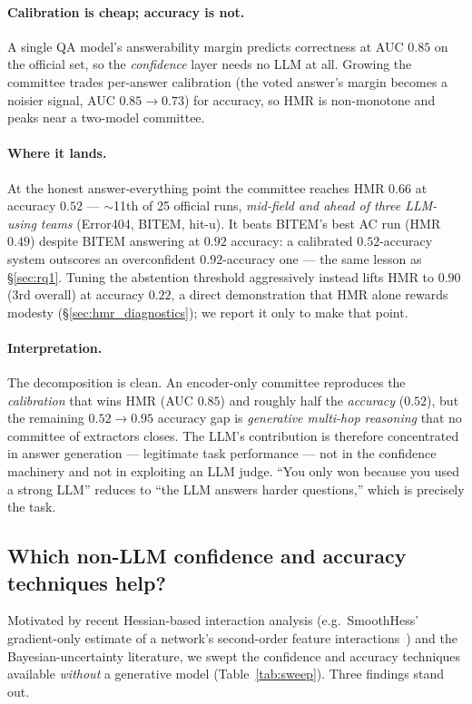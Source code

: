 \documentclass[11pt,a4paper]{article}
\begin{document}
\paragraph{Calibration is cheap; accuracy is not.} A single QA model's
answerability margin predicts correctness at AUC $0.85$ on the official set, so
the \emph{confidence} layer needs no LLM at all. Growing the committee trades
per-answer calibration (the voted answer's margin becomes a noisier signal, AUC
$0.85\!\to\!0.73$) for accuracy, so HMR is non-monotone and peaks near a two-model
committee.

\paragraph{Where it lands.} At the honest answer-everything point the committee
reaches HMR $0.66$ at accuracy $0.52$ --- $\sim$11th of 25 official runs,
\emph{mid-field and ahead of three LLM-using teams} (Error404, BITEM, hit-u). It
beats BITEM's best AC run (HMR $0.49$) despite BITEM answering at $0.92$
accuracy: a calibrated $0.52$-accuracy system outscores an overconfident
$0.92$-accuracy one --- the same lesson as \S\ref{sec:rq1}. Tuning the abstention
threshold aggressively instead lifts HMR to $0.90$ (3rd overall) at accuracy
$0.22$, a direct demonstration that HMR alone rewards modesty
(\S\ref{sec:hmr_diagnostics}); we report it only to make that point.

\paragraph{Interpretation.} The decomposition is clean. An encoder-only committee
reproduces the \emph{calibration} that wins HMR (AUC $0.85$) and roughly half the
\emph{accuracy} ($0.52$), but the remaining $0.52\!\to\!0.95$ accuracy gap is
\emph{generative multi-hop reasoning} that no committee of extractors closes. The
LLM's contribution is therefore concentrated in answer generation --- legitimate
task performance --- not in the confidence machinery and not in exploiting an
LLM judge. ``You only won because you used a strong LLM'' reduces to ``the LLM
answers harder questions,'' which is precisely the task.

\subsection{Which non-LLM confidence and accuracy techniques help?}
\label{sec:nollm_sweep}
Motivated by recent Hessian-based interaction analysis (e.g.\ SmoothHess'
gradient-only estimate of a network's second-order feature
interactions~\cite{smoothhess}) and the Bayesian-uncertainty literature, we swept
the confidence and accuracy techniques available \emph{without} a generative model
(Table~\ref{tab:sweep}). Three findings stand out.
\end{document}
